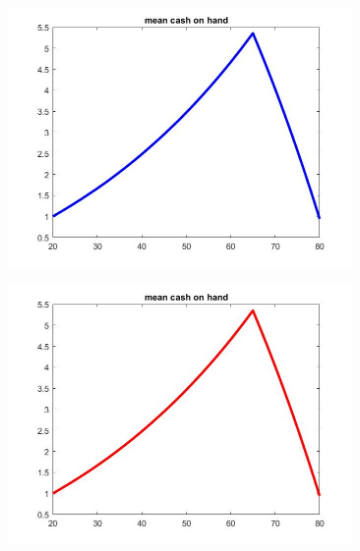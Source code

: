 \documentclass[12pt,a4paper]{article}
\begin{document}
\begin{figure}[h!]
  \centering
  \begin{subfigure}[b]{0.32\linewidth}
    \includegraphics[width=\linewidth]{graphs/Q2/mean_x.jpg}
  \end{subfigure}
  \begin{subfigure}[b]{0.32\linewidth}
      \includegraphics[width=\linewidth]{graphs/Q2/mean_x2.jpg}
  \end{subfigure}
  \begin{subfigure}[b]{0.32\linewidth}

\end{subfigure}
\end{figure}
\end{document}
